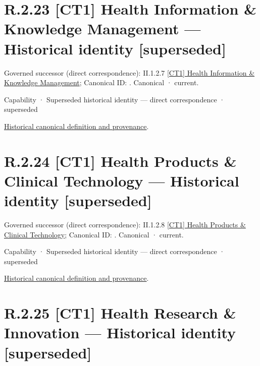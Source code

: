 \section*{R.2.23 [CT1] Health Information \& Knowledge Management — Historical identity [superseded]}
\label{navigation:R.2.23}

{\small Governed successor (direct correspondence): II.1.2.7 \hyperref[element:cca5d5abec204b339eb5b9bd924ed64e]{[CT1] Health Information \& Knowledge Management}; Canonical ID: \texttt{}. Canonical · current.}\par
\label{element:a1c557bd263047d0b3ff566cf50b98c1}
{\small Capability · Superseded historical identity — direct correspondence · superseded}\par
\href{../../../../continuum/strategy/capability/a1c557bd263047d0b3ff566cf50b98c1.md}{Historical canonical definition and provenance}.\par
\section*{R.2.24 [CT1] Health Products \& Clinical Technology — Historical identity [superseded]}
\label{navigation:R.2.24}

{\small Governed successor (direct correspondence): II.1.2.8 \hyperref[element:54388e3202c2403089b5c476c78c4567]{[CT1] Health Products \& Clinical Technology}; Canonical ID: \texttt{}. Canonical · current.}\par
\label{element:a631a8600b8b49df9ef452c48c91349a}
{\small Capability · Superseded historical identity — direct correspondence · superseded}\par
\href{../../../../continuum/strategy/capability/a631a8600b8b49df9ef452c48c91349a.md}{Historical canonical definition and provenance}.\par
\section*{R.2.25 [CT1] Health Research \& Innovation — Historical identity [superseded]}
\label{navigation:R.2.25}

